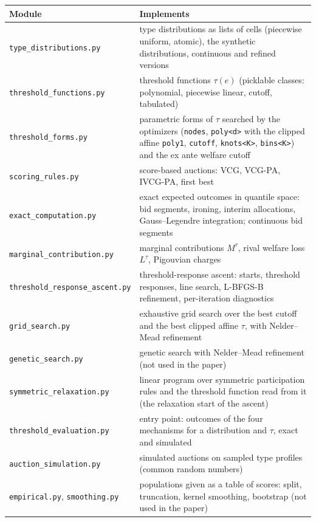\documentclass[11pt]{article}
\newcommand{\code}[1]{\texttt{#1}}
\begin{document}
\begin{table}[ht]
\centering\small
\begin{tabularx}{\linewidth}{@{}l L@{}}
\toprule
Module & Implements \\
\midrule
\code{type\_distributions.py} & type distributions as lists of cells (piecewise uniform, atomic), the synthetic distributions, continuous and refined versions \\
\code{threshold\_functions.py} & threshold functions $\tau(e)$ (picklable classes: polynomial, piecewise linear, cutoff, tabulated) \\
\code{threshold\_forms.py} & parametric forms of $\tau$ searched by the optimizers (\code{nodes}, \code{poly<d>} with the clipped affine \code{poly1}, \code{cutoff}, \code{knots<K>}, \code{bins<K>}) and the ex ante welfare cutoff \\
\code{scoring\_rules.py} & score-based auctions: VCG, VCG-PA, IVCG-PA, first best \\
\code{exact\_computation.py} & exact expected outcomes in quantile space: bid segments, ironing, interim allocations, Gauss--Legendre integration; continuous bid segments \\
\code{marginal\_contribution.py} & marginal contributions $M^\tau$, rival welfare loss $L^\tau$, Pigouvian charges \\
\code{threshold\_response\_ascent.py} & threshold-response ascent: starts, threshold responses, line search, L-BFGS-B refinement, per-iteration diagnostics \\
\code{grid\_search.py} & exhaustive grid search over the best cutoff and the best clipped affine $\tau$, with Nelder--Mead refinement \\
\code{genetic\_search.py} & genetic search with Nelder--Mead refinement (not used in the paper) \\
\code{symmetric\_relaxation.py} & linear program over symmetric participation rules and the threshold function read from it (the relaxation start of the ascent) \\
\code{threshold\_evaluation.py} & entry point: outcomes of the four mechanisms for a distribution and $\tau$, exact and simulated \\
\code{auction\_simulation.py} & simulated auctions on sampled type profiles (common random numbers) \\
\code{empirical.py}, \code{smoothing.py} & populations given as a table of scores: split, truncation, kernel smoothing, bootstrap (not used in the paper) \\

\end{tabularx}
\end{table}
\end{document}
